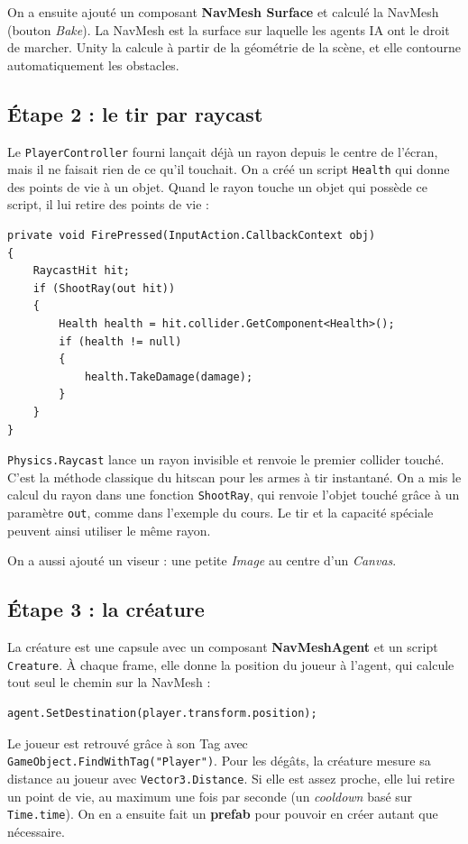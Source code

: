 \documentclass[11pt,a4paper]{article}
\begin{document}
On a ensuite ajouté un composant \textbf{NavMesh Surface} et calculé la NavMesh (bouton \emph{Bake}). La NavMesh est la surface sur laquelle les agents IA ont le droit de marcher. Unity la calcule à partir de la géométrie de la scène, et elle contourne automatiquement les obstacles.

\subsection{Étape 2 : le tir par raycast}
Le \texttt{PlayerController} fourni lançait déjà un rayon depuis le centre de l'écran, mais il ne faisait rien de ce qu'il touchait. On a créé un script \texttt{Health} qui donne des points de vie à un objet. Quand le rayon touche un objet qui possède ce script, il lui retire des points de vie :

\begin{lstlisting}
private void FirePressed(InputAction.CallbackContext obj)
{
    RaycastHit hit;
    if (ShootRay(out hit))
    {
        Health health = hit.collider.GetComponent<Health>();
        if (health != null)
        {
            health.TakeDamage(damage);
        }
    }
}
\end{lstlisting}

\texttt{Physics.Raycast} lance un rayon invisible et renvoie le premier collider touché. C'est la méthode classique du \og hitscan \fg{} pour les armes à tir instantané. On a mis le calcul du rayon dans une fonction \texttt{ShootRay}, qui renvoie l'objet touché grâce à un paramètre \texttt{out}, comme dans l'exemple du cours. Le tir et la capacité spéciale peuvent ainsi utiliser le même rayon.

On a aussi ajouté un viseur : une petite \emph{Image} au centre d'un \emph{Canvas}.

\subsection{Étape 3 : la créature}
La créature est une capsule avec un composant \textbf{NavMeshAgent} et un script \texttt{Creature}. À chaque frame, elle donne la position du joueur à l'agent, qui calcule tout seul le chemin sur la NavMesh :

\begin{lstlisting}
agent.SetDestination(player.transform.position);
\end{lstlisting}

Le joueur est retrouvé grâce à son Tag avec \texttt{GameObject.FindWithTag("Player")}. Pour les dégâts, la créature mesure sa distance au joueur avec \texttt{Vector3.Distance}. Si elle est assez proche, elle lui retire un point de vie, au maximum une fois par seconde (un \emph{cooldown} basé sur \texttt{Time.time}). On en a ensuite fait un \textbf{prefab} pour pouvoir en créer autant que nécessaire.
\end{document}
